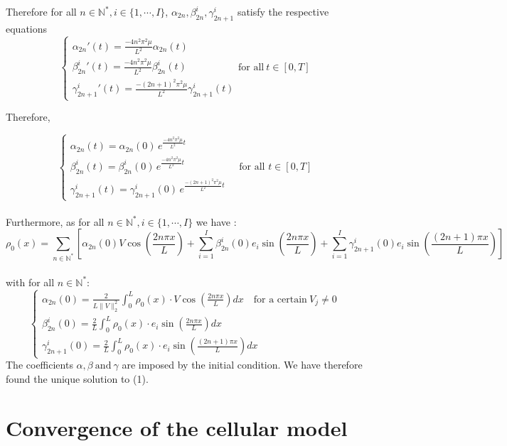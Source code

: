 \documentclass{article}
\begin{document}
Therefore for all $n \in \mathbb{N^*}, i \in \{1, \cdots, I\}$, $\alpha_{2n}, \beta_{2n}^{i}, \gamma_{2n+1}^{i}$ satisfy the respective equations \[\begin{cases}
\alpha_{2n}'(t) = \frac{-4n^2\pi^2\mu}{L^2}\alpha_{2n}(t)\\
{\beta_{2n}^{i}}'(t) = \frac{-4n^2\pi^2\mu}{L^2}\beta_{2n}^{i}(t)\\
{\gamma_{2n+1}^{i}}'(t) = \frac{-(2n + 1)^2\pi^2\mu}{L^2}\gamma_{2n+1}^{i}(t) 
\end{cases}
\text{for all}\ t \in [0, T]\]

Therefore, 

\[
\begin{cases}
\alpha_{2n}(t) = \alpha_{2n}(0)\, e^{\frac{-4n^2\pi^2\mu}{L^2} t} \\
\beta_{2n}^{i}(t) = \beta_{2n}^{i}(0)\, e^{\frac{-4n^2\pi^2\mu}{L^2} t} \\
\gamma_{2n+1}^{i}(t) = \gamma_{2n+1}^{i}(0)\, e^{\frac{-(2n + 1)^2\pi^2\mu}{L^2} t}
\end{cases}
\quad \text{for all } t \in [0, T]
\] \\

Furthermore, as for all $n \in \mathbb{N^*}, i \in \{1, \cdots, I\}$ we have :
\[\rho_0(x) = \sum_{n \in \mathbb{N^*}}\left[ \alpha_{2n}(0)V\cos\left(\frac{2n\pi x}{L}\right) + \sum_{i=1}^{I}\beta_{2n}^{i}(0)e_i \sin\left(\frac{2n\pi x}{L}\right) + \sum_{i=1}^{I}\gamma_{2n+1}^{i}(0)e_i \sin\left(\frac{(2n + 1)\pi x}{L}\right)\right]\] \\

with for all $n \in \mathbb{N}^*$:
\[
\begin{cases}
    \alpha_{2n}(0) = \frac{2}{L\|V\|_2^2}\int_0^L\rho_0(x)\cdot V\cos(\frac{2n\pi x}{L})dx  \quad \text{for a certain} \ V_j \neq 0 \\
    \beta_{2n}^i(0) = \frac{2}{L}\int_0^L\rho_0(x)\cdot e_i\sin(\frac{2n\pi x}{L})dx \\
    \gamma_{2n + 1}^i(0) = \frac{2}{L}\int_0^L\rho_0(x)\cdot e_i\sin(\frac{(2n+1)\pi x}{L})dx
\end{cases}
\]
The coefficients $\alpha, \beta \ \text{and} \ \gamma$  are imposed by the initial condition. We have therefore found the unique solution to (1).



\section{Convergence of the cellular model}
\end{document}
